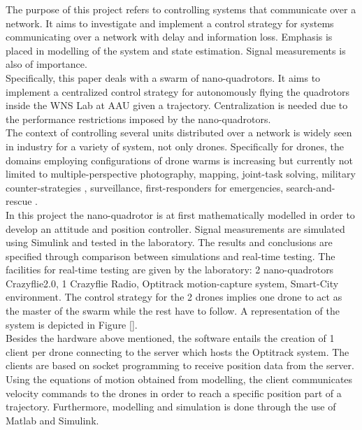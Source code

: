 \label{Introduction}

The purpose of this project refers to controlling systems that communicate over a network. It aims to investigate and implement a control strategy for systems communicating over a network with delay and information loss. Emphasis is placed in modelling of the system and state estimation. Signal measurements is also of importance.\\
Specifically, this paper deals with a swarm of nano-quadrotors. It aims to implement a centralized control strategy for autonomously flying the quadrotors inside the WNS Lab at AAU given a trajectory. Centralization is needed due to the performance restrictions imposed by the nano-quadrotors.\\


The context of controlling several units distributed over a network is widely seen in industry for a variety of system, not only drones. Specifically for drones, the domains employing configurations of drone warms is increasing but currently not limited to multiple-perspective photography, mapping, joint-task solving, military counter-strategies \cite{web_swarm}, surveillance, first-responders for emergencies, search-and-rescue \cite{web_coop}. \\


In this project the nano-quadrotor is at first mathematically modelled in order to develop an attitude and position controller. Signal measurements are simulated using Simulink and tested in the laboratory. The results and conclusions are specified through comparison between simulations and real-time testing. The facilities for real-time testing are given by the laboratory: 2 nano-quadrotors Crazyflie2.0, 1 Crazyflie Radio, Optitrack motion-capture system, Smart-City environment. The control strategy for the 2 drones implies one drone to act as the master of the swarm while the rest have to follow. A representation of the system is depicted in Figure \ref{}.\\


Besides the hardware above mentioned, the software entails the creation of 1 client per drone connecting to the server which hosts the Optitrack system. The clients are based on socket programming to receive position data from the server. Using the equations of motion obtained from modelling, the client communicates velocity commands to the drones in order to reach a specific position part of a trajectory. Furthermore, modelling and simulation is done through the use of Matlab and Simulink.

